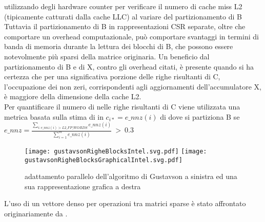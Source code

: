 utilizzando degli hardware counter per verificare il numero di cache miss L2
(tipicamente catturati dalla cache LLC) al variare del partizionamento di B %
\voidLine
Tuttavia il partizionamento di B in rappresentazioni CSR separate, 
oltre che comportare un overhead computazionale, può comportare svantaggi in
termini di banda di memoria durante la lettura dei blocchi di B, che possono
essere notevolmente più sparsi della matrice originaria. %
\voidLine
Un beneficio dal partizionamento di B e di X, contro gli overhead citati, è
presente quando si ha certezza che per una significativa porzione delle righe
risultanti di C, l'occupazione dei non zeri, corrispondenti agli aggiornamenti
dell'accumulatore X, è maggiore della dimensione della cache L2.\\
Per quantificare il numero di \nnz nelle righe risultanti di C viene utilizzata
una metrica basata sulla stima di \nnz in $c_{i*}=e\_nnz(i)$ di
dove si partiziona B se
$e\_nnz = \frac{\sum\limits_{i:e\_nnz(i) > L2\_FP\_WORDS} e\_nnz(i)}
{\sum\limits_{i=1}^m e\_nnz(i)} ~>~0.3$\\
\begin{figure}[H]
	\centering
  		\texttt{[image: gustavsonRigheBlocksIntel.svg.pdf]}
  		\texttt{[image: gustavsonRigheBlocksGraphicalIntel.svg.pdf]} 
  		\caption[parallelizzazione Gustavson con accumulatore denso]
	    {adattamento parallelo dell'algoritmo di Gustavson a sinistra ed una sua rappresentazione grafica a destra}
	\decoRule \label{figCode:gustavsonRigheBlocksIntel} \label{fig:gustavsonRigheBlocksGraphicalIntel}
\end{figure}

L'uso di un vettore denso per operazioni tra matrici sparse è stato 
affrontato originariamente da .\\

